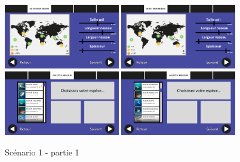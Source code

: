 \documentclass{article}
\begin{document}
\begin{figure}[!h]
	\includegraphics[width=0.45\textwidth]{assets/prototype/haute/Diapositive5}
	\hfill
	\includegraphics[width=0.45\textwidth]{assets/prototype/haute/Diapositive6}
	\includegraphics[width=0.45\textwidth]{assets/prototype/haute/Diapositive7}
	\hfill
	\includegraphics[width=0.45\textwidth]{assets/prototype/haute/Diapositive8}
	\caption{Scénario 1 - partie 1}
	\label{Scenario 1 - partie 1}
\end{figure}
\newpage
\end{document}
